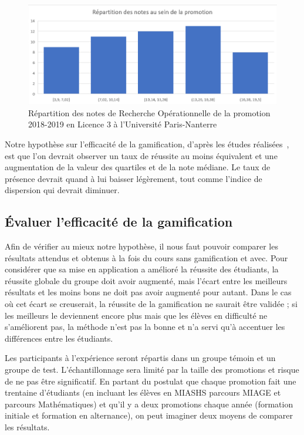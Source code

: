 \begin{figure}
    \centering
    \includegraphics[width=\linewidth]{Images/Repartition_notes_RO.png}
    \caption{Répartition des notes de Recherche Opérationnelle de la promotion 2018-2019 en Licence 3 à l'Université Paris-Nanterre}
    \label{fig:OR_notes_repart}
\end{figure}


Notre hypothèse sur l'efficacité de la gamification, d'après les études réalisées~\cite{gamif-educ}, est que l'on devrait observer un taux de réussite au moins équivalent et une augmentation de la valeur des quartiles et de la note médiane. Le taux de présence devrait quand à lui baisser légèrement, tout comme l'indice de dispersion qui devrait diminuer.

\subsection{Évaluer l'efficacité de la gamification}
Afin de vérifier au mieux notre hypothèse, il nous faut pouvoir comparer les résultats attendus et obtenus à la fois du cours sans gamification et avec. Pour considérer que sa mise en application a amélioré la réussite des étudiants, la réussite globale du groupe doit avoir augmenté, mais l'écart entre les meilleurs résultats et les moins bons ne doit pas avoir augmenté pour autant. Dans le cas où cet écart se creuserait, la réussite de la gamification ne saurait être validée ; si les meilleurs le deviennent encore plus mais que les élèves en difficulté ne s'améliorent pas, la méthode n'est pas la bonne et n'a servi qu'à accentuer les différences entre les étudiants. \par

Les participants à l'expérience seront répartis dans un groupe témoin et un groupe de test. L'échantillonnage sera limité par la taille des promotions et risque de ne pas être significatif. En partant du postulat que chaque promotion fait une trentaine d'étudiants (en incluant les élèves en MIASHS parcours MIAGE et parcours Mathématiques) et qu'il y a deux promotions chaque année (formation initiale et formation en alternance), on peut imaginer deux moyens de comparer les résultats. \par

